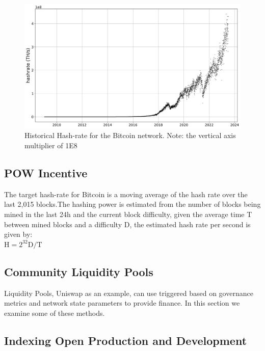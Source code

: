\documentclass[final,5p,times,twocolumn,authoryear]{elsarticle}
\begin{document}
\begin{figure}
    \centering
    \includegraphics[width=1\linewidth]{figs/hash_btc.png}
    \caption{Historical Hash-rate for the Bitcoin network. Note: the vertical axis multiplier of 1E8}
    \label{fig:btchash}
\end{figure}

 \subsection{POW Incentive}

The target hash-rate for Bitcoin is a moving average of the hash rate over the last 2,015 blocks.The hashing power is estimated from the number of blocks being mined in the last 24h and the current block difficulty, given the average time T between mined blocks and a difficulty D, the estimated hash rate per second is given by:\\

$\textrm{H} = 2^{32} \textrm{D} / \textrm{T}$\\

\subsection{Community Liquidity Pools}
Liquidity Pools, Uniswap as an example, can use triggered based on governance metrics and network state parameters to provide finance. In this section we examine some of these methods.


\subsection{Indexing Open Production and Development}
\end{document}
